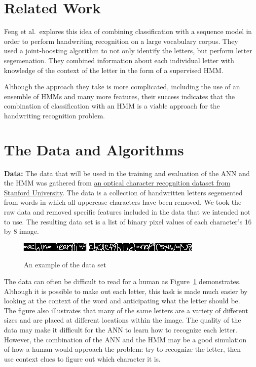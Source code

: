 \documentclass[11pt,letterpaper]{article}
\begin{document}
\section{Related Work}

Feng et al.\ explores this idea of combining classification with a sequence
model in order to perform handwriting recognition on a large vocabulary corpus. They used a
joint-boosting algorithm to not only identify the letters, but perform letter segemenation. They
combined information about each individual letter with knowledge of the context of the letter in the
form of a supervised HMM.

Although the approach they take is more complicated, including the use of an ensemble of HMMs and
many more features, their success indicates that the combination of classification with an HMM is a
viable approach for the handwriting recognition problem.

\section{The Data and Algorithms}

{\bf Data:} The data that will be used in the training and evaluation of the ANN and the HMM was gathered from
\href{http://ai.stanford.edu/~btaskar/ocr/}{an optical character recognition dataset from
Stanford University}.
The data is a collection of handwritten letters segemented from words in which all uppercase
characters have been removed. We took the raw data and removed specific features included in the
data that we intended not to use. The resulting data set is a list of binary pixel values of each
character's 16 by 8 image.
\begin{figure}[h]
    \centering
    \includegraphics{img/ml.jpg}
    \includegraphics{img/alphabet.jpg}
    \caption{An example of the data set}
    \label{fig:exampleData}
\end{figure}

The data can often be difficult to read for a human as Figure~\ref{fig:exampleData} demonstrates.  Although it is
possible to make out each letter, this task is made much easier by looking at the context of the
word and anticipating what the letter should be. The figure also illustrates that many of the same
letters are a variety of different sizes and are placed at different locations within the image. The
quality of the data may make it difficult for the ANN to learn how to recognize each letter.
However, the combination of the ANN and the HMM may be a good simulation of how a human would
approach the problem: try to recognize the letter, then use context clues to figure out which
character it is.
\end{document}
